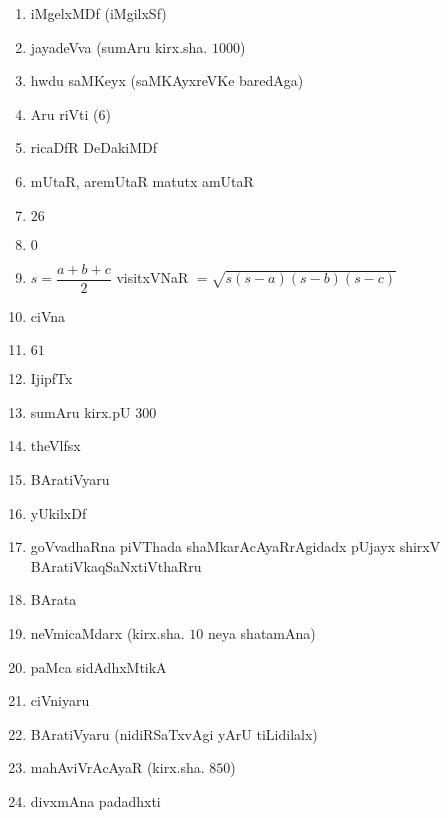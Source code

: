 \begin{enumerate}
\item iMgelxMDf (iMgilxSf)

\item jayadeVva (sumAru kirx.sha. $1000$)

\item hwdu saMKeyx (saMKAyxreVKe baredAga)

\item Aru riVti ($6$)

\item ricaDfR DeDakiMDf

\item mUtaR, aremUtaR matutx amUtaR 

\item $26$

\item $0$

\item $s= \dfrac{a+b+c}{2}$ \quad visitxVNaR $=\sqrt{s(s-a)(s-b)(s-c)}$

\item ciVna

\item $61$

\item IjipfTx

\item sumAru kirx.pU $300$

\item theVlfsx

\item BAratiVyaru

\item yUkilxDf

\item goVvadhaRna piVThada shaMkarAcAyaRrAgidadx pUjayx shirxV BAratiVkaqSaNxtiVthaRru

\item BArata

\item neVmicaMdarx (kirx.sha. $10$ neya shatamAna)

\item paMca sidAdhxMtikA

\item ciVniyaru

\item BAratiVyaru (nidiRSaTxvAgi yArU tiLidilalx)

\item mahAviVrAcAyaR (kirx.sha. $850$)

\item divxmAna padadhxti


\end{enumerate}
